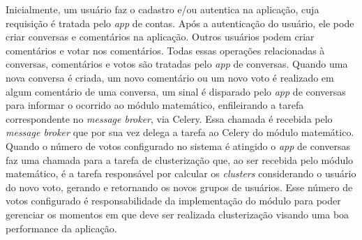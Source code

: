 	Inicialmente, um usuário faz o cadastro e/ou autentica na aplicação,
	cuja requisição é tratada pelo \textit{app} de contas.
	Após a autenticação do usuário, ele pode criar conversas e comentários na aplicação.
	Outros usuários podem criar comentários e votar nos comentários.
	Todas essas operações relacionadas à conversas, comentários e votos
	são tratadas pelo \textit{app} de conversas.
	Quando uma nova conversa é criada, um novo comentário ou um novo voto é realizado
	em algum comentário de uma conversa, um sinal é disparado pelo \textit{app} de conversas
	para informar o ocorrido ao módulo matemático, enfileirando a tarefa correspondente
	no \textit{message broker}, via Celery.
	Essa chamada é recebida pelo \textit{message broker} que por sua vez delega
	a tarefa ao Celery do módulo matemático.
	Quando o número de votos configurado no sistema é atingido o \textit{app} de conversas
	faz uma chamada para a tarefa de clusterização que, ao ser recebida pelo módulo matemático,
	é a tarefa responsável por calcular os \textit{clusters} considerando o usuário do novo voto,
	gerando e retornando os novos grupos de usuários. Esse número de votos configurado é responsabilidade
	da implementação do módulo para poder gerenciar os momentos em que deve ser realizada clusterização visando 
	uma boa performance da aplicação.
	